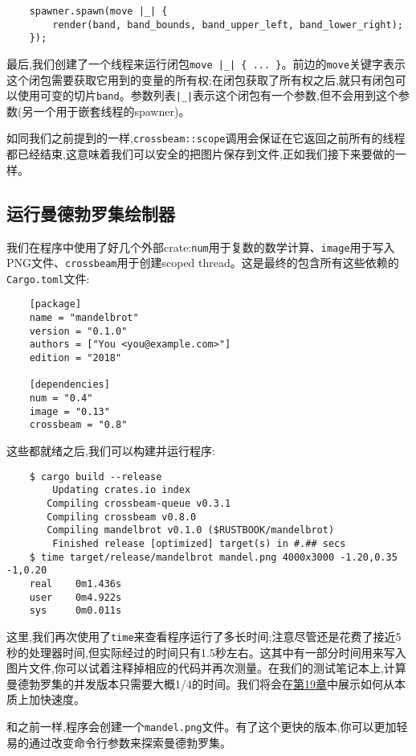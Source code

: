 \begin{verbatim}
    spawner.spawn(move |_| {
        render(band, band_bounds, band_upper_left, band_lower_right);
    });
\end{verbatim}

最后,我们创建了一个线程来运行闭包\texttt{move |\_| \{ ... \}}。前边的\texttt{move}关键字表示这个闭包需要获取它用到的变量的所有权;在闭包获取了所有权之后,就只有闭包可以使用可变的切片\texttt{band}。参数列表\texttt{|\_|}表示这个闭包有一个参数,但不会用到这个参数(另一个用于嵌套线程的spawner)。

如同我们之前提到的一样,\texttt{crossbeam::scope}调用会保证在它返回之前所有的线程都已经结束,这意味着我们可以安全的把图片保存到文件,正如我们接下来要做的一样。

\subsection{运行曼德勃罗集绘制器}

我们在程序中使用了好几个外部crate:\texttt{num}用于复数的数学计算、\texttt{image}用于写入PNG文件、\texttt{crossbeam}用于创建scoped thread。这是最终的包含所有这些依赖的\texttt{Cargo.toml}文件:
\begin{verbatim}
    [package]
    name = "mandelbrot"
    version = "0.1.0"
    authors = ["You <you@example.com>"]
    edition = "2018"

    [dependencies]
    num = "0.4"
    image = "0.13"
    crossbeam = "0.8"
\end{verbatim}

这些都就绪之后,我们可以构建并运行程序:
\begin{verbatim}
    $ cargo build --release
        Updating crates.io index
       Compiling crossbeam-queue v0.3.1
       Compiling crossbeam v0.8.0
       Compiling mandelbrot v0.1.0 ($RUSTBOOK/mandelbrot)
        Finished release [optimized] target(s) in #.## secs
    $ time target/release/mandelbrot mandel.png 4000x3000 -1.20,0.35 -1,0.20
    real    0m1.436s
    user    0m4.922s
    sys     0m0.011s
\end{verbatim}

这里,我们再次使用了\texttt{time}来查看程序运行了多长时间;注意尽管还是花费了接近5秒的处理器时间,但实际经过的时间只有1.5秒左右。这其中有一部分时间用来写入图片文件,你可以试着注释掉相应的代码并再次测量。在我们的测试笔记本上,计算曼德勃罗集的并发版本只需要大概1/4的时间。我们将会在\hyperref[ch19]{第19章}中展示如何从本质上加快速度。

和之前一样,程序会创建一个\texttt{mandel.png}文件。有了这个更快的版本,你可以更加轻易的通过改变命令行参数来探索曼德勃罗集。

